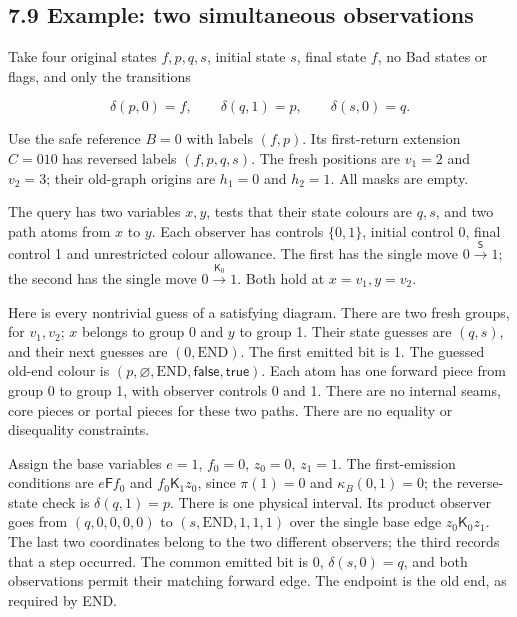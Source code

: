 \documentclass[
  11pt,
  a4paper,
]{article}
\begin{document}
\subsection{7.9 Example: two simultaneous
observations}\label{example-two-simultaneous-observations}

Take four original states \(f,p,q,s\), initial state \(s\), final state
\(f\), no Bad states or flags, and only the transitions

\[\delta(p,0)=f,\qquad \delta(q,1)=p,\qquad \delta(s,0)=q.\]

Use the safe reference \(B=0\) with labels \((f,p)\). Its first-return
extension \(C=010\) has reversed labels \((f,p,q,s)\). The fresh
positions are \(v_1=2\) and \(v_2=3\); their old-graph origins are
\(h_1=0\) and \(h_2=1\). All masks are empty.

The query has two variables \(x,y\), tests that their state colours are
\(q,s\), and two path atoms from \(x\) to \(y\). Each observer has
controls \(\{0,1\}\), initial control 0, final control 1 and
unrestricted colour allowance. The first has the single move
\(0\xrightarrow{\mathsf S}1\); the second has the single move
\(0\xrightarrow{\mathsf K_0}1\). Both hold at \(x=v_1,y=v_2\).

Here is every nontrivial guess of a satisfying diagram. There are two
fresh groups, for \(v_1,v_2\); \(x\) belongs to group 0 and \(y\) to
group 1. Their state guesses are \((q,s)\), and their next guesses are
\((0,\mathrm{END})\). The first emitted bit is 1. The guessed old-end
colour is \((p,\varnothing,\mathrm{END},\mathsf{false},\mathsf{true})\).
Each atom has one forward piece from group 0 to group 1, with observer
controls 0 and 1. There are no internal seams, core pieces or portal
pieces for these two paths. There are no equality or disequality
constraints.

Assign the base variables \(e=1\), \(f_0=0\), \(z_0=0\), \(z_1=1\). The
first-emission conditions are \(e\mathrel{\mathsf F}f_0\) and
\(f_0\mathrel{\mathsf K_1}z_0\), since \(\pi(1)=0\) and
\(\kappa_B(0,1)=0\); the reverse-state check is \(\delta(q,1)=p\). There
is one physical interval. Its product observer goes from \((q,0,0,0,0)\)
to \((s,\mathrm{END},1,1,1)\) over the single base edge
\(z_0\mathrel{\mathsf K_0}z_1\). The last two coordinates belong to the
two different observers; the third records that a step occurred. The
common emitted bit is 0, \(\delta(s,0)=q\), and both observations permit
their matching forward edge. The endpoint is the old end, as required by
END.
\end{document}
